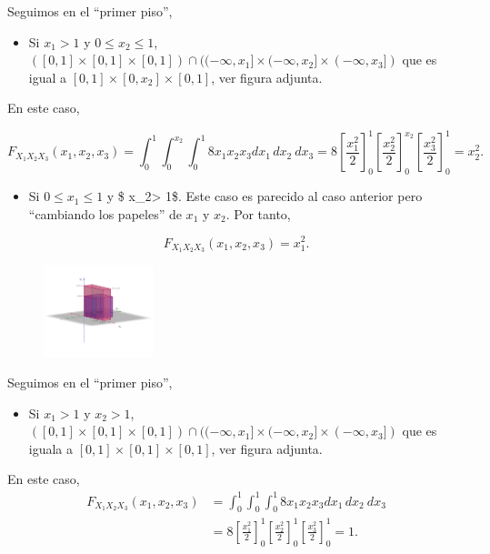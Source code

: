 \documentclass[
  letterpaper,
  DIV=11,
  numbers=noendperiod]{scrreprt}
\providecommand{\tightlist}{%
  \setlength{\itemsep}{0pt}\setlength{\parskip}{0pt}}\usepackage{longtable,booktabs,array}
\begin{document}
Seguimos en el ``primer piso'',

\begin{itemize}
\tightlist
\item
  Si \(x_1 >1\) y \(0\leq x_2\leq 1\),
  \(([0,1]\times [0,1]\times [0,1])\cap ((-\infty,x_1]\times (-\infty,x_2]\times (-\infty,x_3])\)
  que es igual a \([0,1]\times [0,x_2]\times [0,1]\), ver figura
  adjunta.
\end{itemize}

En este caso,

\[
F_{X_1X_2X_3}(x_1,x_2,x_3)=\int_{0}^{1}\int_{0}^{x_2}\int_{0}^{1} 8 x_1 x_2 x_3 dx_1\, dx_2\ dx_3 = 
8\left[\frac{x_1^2}{2}\right]_0^{1}\left[\frac{x_2^2}{2}\right]_0^{x_2}\left[\frac{x_3^2}{2}\right]_0^{1} = x_2^2.
\]

\begin{itemize}
\tightlist
\item
  Si \(0\leq x_1 \leq 1\) y \$ x\_2\textgreater{} 1\$. Este caso es
  parecido al caso anterior pero ``cambiando los papeles'' de \(x_1\) y
  \(x_2\). Por tanto,
\end{itemize}

\[
F_{X_1X_2X_3}(x_1,x_2,x_3)=x_1^2.
\]

\begin{figure}

{\centering \includegraphics[width=1.25in,height=\textheight]{Images/Fx1x2x3pisox1.png}

}

\end{figure}

Seguimos en el ``primer piso'',

\begin{itemize}
\tightlist
\item
  Si \(x_1>1\) y \(x_2>1\),
  \(([0,1]\times [0,1]\times [0,1])\cap ((-\infty,x_1]\times (-\infty,x_2]\times (-\infty,x_3])\)
  que es iguala a \([0,1]\times [0,1]\times [0,1]\), ver figura adjunta.
\end{itemize}

En este caso, \[
\begin{array}{rl}
F_{X_1X_2X_3}(x_1,x_2,x_3)& =\int_{0}^{1}\int_{0}^{1}\int_{0}^{1} 8 x_1 x_2 x_3 dx_1\, dx_2\ dx_3 \\
& = 8\left[\frac{x_1^2}{2}\right]_0^{1}\left[\frac{x_2^2}{2}\right]_0^{1}\left[\frac{x_3^2}{2}\right]_0^{1} = 1.
\end{array}
\]
\end{document}
